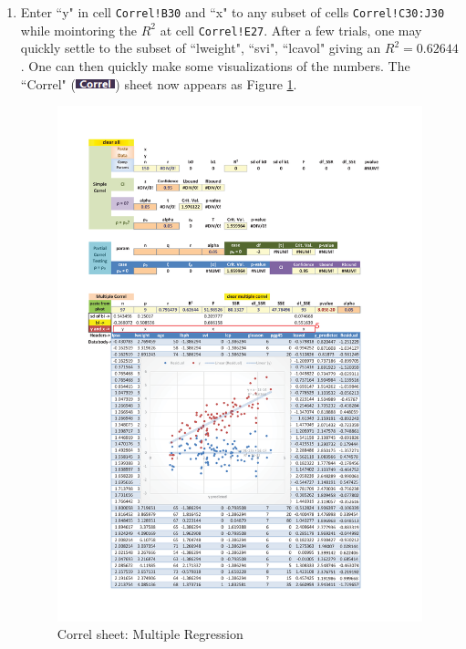 \documentclass[article]{jss}
\newcommand{\shtCorrel}{``Correl" (\includegraphics[height=8pt, keepaspectratio=true]{CorrelSheetTab_png}) }
\begin{document}
\begin{enumerate}
          \item Enter ``y" in cell \texttt{Correl!B30} and ``x" to any subset of cells \texttt{Correl!C30:J30} while mointoring the $R^2$ at cell \texttt{Correl!E27}. After a few trials, one may quickly settle to the subset of {``lweight", ``svi", ``lcavol"} giving an $R^2=0.62644$. One can then quickly make some visualizations of the numbers. The \shtCorrel sheet now appears as Figure \ref{fig:Correl sheet: Multiple Regression}.
          \begin{figure}[!tbh]
            \includegraphics[width=\linewidth, keepaspectratio=true]{img/Correl_multipleRegression_selectedSubset_markup}
            \centering{}\protect\caption{Correl sheet: Multiple Regression}\label{fig:Correl sheet: Multiple Regression}
          \end{figure}          
        \end{enumerate}
\end{document}
